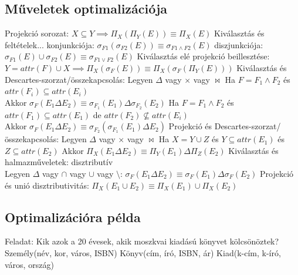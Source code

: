 \documentclass[12pt,a4paper]{article}
\begin{document}
\subsection{Műveletek optimalizációja}

\begin{outline}
	\1 Projekció sorozat: $X \subseteq Y \implies \Pi_X(\Pi_Y(E)) \equiv \Pi_X(E)$
	\1 Kiválasztás és feltételek...
		\2 konjunkciója: $\sigma_{F1}(\sigma_{F2}(E)) \equiv \sigma_{F1 \wedge F2}(E)$
		\2 diszjunkciója: $\sigma_{F1}(E) \cup \sigma_{F2}(E) \equiv \sigma_{F1 \lor F2}(E)$
	\1 Kiválasztás elé projekció beillesztése:\\
	$Y = attr(F) \cup X \implies \Pi_X(\sigma_F(E)) \equiv \Pi_X(\sigma_F(\Pi_Y(E)))$
	\1 Kiválasztás és Descartes-szorzat/összekapcsolás:
		\2 Legyen $\Delta$ vagy $\times$ vagy $\bowtie$
		\2 Ha $F=F_1 \wedge F_2$ és $attr(F_i) \subseteq attr(E_i)$\\
		Akkor $\sigma_F(E_1 \Delta E_2) \equiv \sigma_{F_1} (E_1) \Delta \sigma_{F_2} (E_2)$
		\2 Ha $F=F_1 \wedge F_2$ és $attr(F_1) \subseteq attr(E_1)$ de $attr(F_2) \not \subseteq attr(E_i)$\\
		Akkor $\sigma_F(E_1 \Delta E_2) \equiv \sigma_{F_2}(\sigma_{F_1} (E_1) \Delta E_2)$
\pagebreak
	\1 Projekció és Descartes-szorzat/összekapcsolás:
		\2 Legyen $\Delta$ vagy $\times$ vagy $\bowtie$
		\2 Ha $X=Y \cup Z$ és $Y \subseteq attr(E_1)$ és $Z \subseteq attr(E_2)$
		\2 Akkor $\Pi_X(E_1 \Delta E_2) \equiv \Pi_Y(E_1) \Delta \Pi_Z(E_2)$
	\1 Kiválasztás és halmazműveletek: disztributív\\
	Legyen $\Delta$ vagy $\cap$ vagy $\cup$ vagy $\setminus$:
	$\sigma_F (E_1 \Delta E_2) \equiv \sigma_F(E_1) \Delta \sigma_F(E_2)$
	\1 Projekció és unió disztributivitás: $\Pi_X(E_1 \cup E_2) \equiv \Pi_X (E_1) \cup \Pi_X (E_2)$
\end{outline}

\subsection{Optimalizációra példa}

\begin{outline}
	\1 Feladat: Kik azok a 20 évesek, akik moszkvai kiadású könyvet kölcsönöztek?
		\2 Személy(név, kor, város, ISBN)
		\2 Könyv(cím, író, ISBN, ár)
		\2 Kiad(k-cím, k-író, város, ország)
\end{outline}
\end{document}
